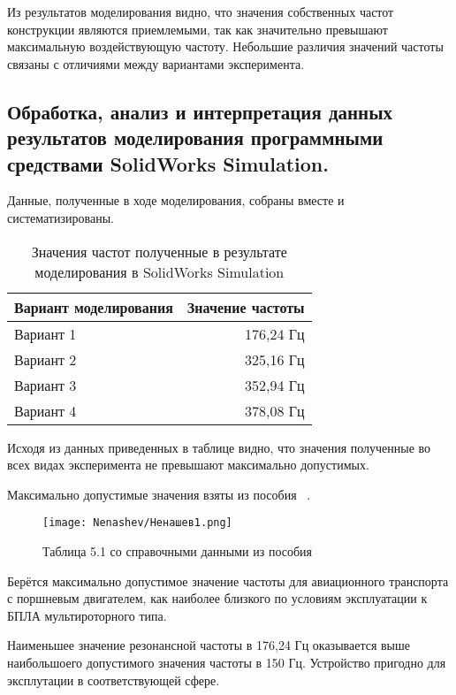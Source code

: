 
Из результатов моделирования видно, что значения собственных частот
конструкции являются приемлемыми, так как значительно превышают
максимальную воздействующую частоту. Небольшие различия значений
частоты связаны с отличиями между вариантами эксперимента.

\subsection{Обработка, анализ и интерпретация данных результатов
моделирования программными средствами SolidWorks Simulation.}

Данные, полученные в ходе моделирования, собраны вместе и
систематизированы.

\begin{table}[H]
  \centering
    \caption{Значения частот полученные в результате моделирования в SolidWorks Simulation}
  \begin{tabular}{|l | r |}
    \hline
    Вариант моделирования & Значение частоты \\ \hline
    Вариант 1 & 176,24 Гц\\ \hline
    Вариант 2 & 325,16 Гц\\ \hline
    Вариант 3 & 352,94 Гц \\ \hline
    Вариант 4 & 378,08 Гц \\ \hline
  \end{tabular}
\end{table}

Исходя из данных приведенных в таблице видно, что значения полученные
во всех видах эксперимента не превышают максимально допустимых.

Максимально допустимые значения взяты из пособия ~\cite{Nenashev}.

\begin{figure}[H]
  \centering
  \texttt{[image: Nenashev/Ненашев1.png]}
  \caption{Таблица 5.1 со справочными данными из пособия}
\end{figure}

Берётся максимально допустимое значение частоты для авиационного транспорта с
поршневым двигателем, как наиболее близкого по условиям эксплуатации к
БПЛА мультироторного типа.

Наименьшее значение резонансной частоты в 176,24 Гц оказывается выше
наибольшоего допустимого значения частоты в 150 Гц. Устройство пригодно для
эксплутации в соответствующей сфере.

\newpage

